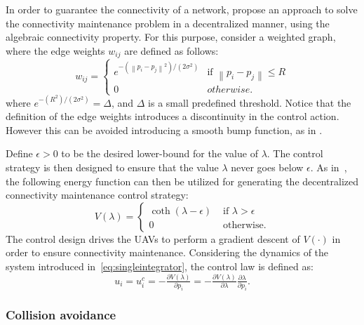 
In order to guarantee the connectivity of a network, \cite{sabattiniijrr2013} propose an approach to solve the connectivity maintenance problem in a decentralized manner, using the algebraic connectivity property. For this purpose, consider a weighted graph, where the edge weights $w_{ij}$ are defined as follows:
\begin{equation}
w_{ij}=\left\{
\begin{array}{ll}
e^{-\left(\left\|p_i-p_j\right\|^2\right)/\left(2\sigma^2\right)}&\mbox{if }\left\|p_i-p_j\right\|\leq R\\
0&{otherwise.}	
\end{array}\right. 
\label{eq:edgeweightIJRR}
\end{equation}
where $e^{-\left(R^2\right)/\left(2\sigma^2\right)} = \Delta$, and $\Delta$ is a small predefined threshold. Notice that the definition of the edge weights introduces a discontinuity in the control action. However this can be avoided introducing a smooth bump function, as in \cite{do2008}. 

Define $\epsilon>0$ to be the desired lower-bound for the value of $\lambda$. The control strategy is then designed to ensure that the value $\lambda$ never goes below $\epsilon$. As in~\cite{sabattiniijrr2013}, the following energy function can then be utilized for generating the decentralized connectivity maintenance control strategy:
\begin{equation}
V\left(\lambda\right)=\left\{
\begin{array}{ll}
\coth \left(\lambda - \epsilon\right)\,\, & \mbox{if } \lambda>\epsilon\\
0 & \mbox{otherwise.}
\end{array}\right.
\label{eq:totaltensionCDC}
\end{equation}
The control design drives the UAVs to perform a gradient descent of $V\left(\cdot\right)$ in order to ensure connectivity maintenance. Considering the dynamics of the system introduced in~\eqref{eq:singleintegrator}, the control law is defined as: %
\begin{equation}
{u}_i=u_i^c = -\tfrac{\partial V\left(\lambda\right)}{\partial p_i}=-\tfrac{\partial V\left(\lambda\right)}{\partial \lambda}\tfrac{\partial \lambda}{\partial p_i}.
\label{eq:Kfunction}
\end{equation}

\subsubsection{Collision avoidance}

